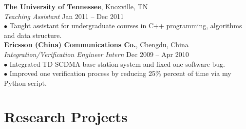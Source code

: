 \documentclass[margin, centered]{resume}
\begin{document}
\begin{resume}
    \textbf{The University of Tennessee}, Knoxville, TN \\\vspace{0mm}%
    \emph{Teaching Assistant} \hfill Jan 2011 -- Dec 2011\vspace{0mm}\\
    $\bullet$ Taught assistant for undergraduate courses in C++ programming, algorithms and data structure.\vspace{-5mm}\\
	
    \textbf{Ericsson (China) Communications Co.}, Chengdu, China \vspace{0mm}\\%
	\emph{Integration/Verification Engineer Intern} \hfill Dec 2009 -- Apr 2010\vspace{0mm}\\
    $\bullet$ Integrated TD-SCDMA base-station system and fixed one software bug.\vspace{0mm}\\
    $\bullet$ Improved one verification process by reducing 25\% percent of time via my Python script.\vspace{-2mm}\\

    \section{\mysidestyle Research Projects}
	

\end{resume}
\end{document}
